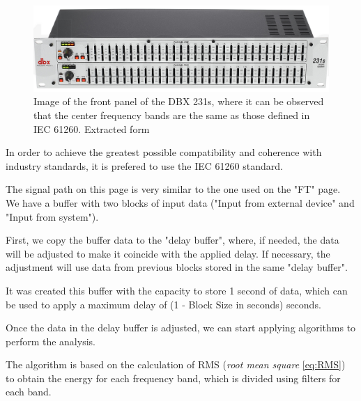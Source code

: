 \begin{figure}[H]
	\centering
	\includegraphics[width=1
	\linewidth]{Figures/DBX_231s.png}
	\caption[Image of the front panel of the DBX 231s]{Image of the front panel of the DBX 231s, where it can be observed that the center frequency bands are the same as those defined in IEC 61260. Extracted form \cite{DBX_31s}}
	\label{fig:DBX_31s}
\end{figure}

In order to achieve the greatest possible compatibility and coherence with industry standards, it is prefered to use the IEC 61260 standard.


The signal path on this page is very similar to the one used on the "FT" page. We have a buffer with two blocks of input data ("Input from external device" and "Input from system").

First, we copy the buffer data to the "delay buffer", where, if needed, the data will be adjusted to make it coincide with the applied delay. If necessary, the adjustment will use data from previous blocks stored in the same "delay buffer".

It was created this buffer with the capacity to store 1 second of data, which can be used to apply a maximum delay of (1 - Block Size in seconds) seconds.

Once the data in the delay buffer is adjusted, we can start applying algorithms to perform the analysis.

The algorithm is based on the calculation of RMS (\textit{root mean square} \ref{eq:RMS}) to obtain the energy for each frequency band, which is divided using filters for each band.


